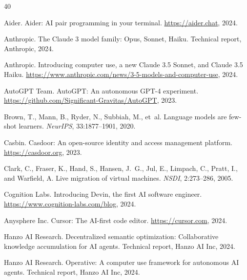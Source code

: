 \documentclass[11pt]{article}
\begin{document}

\begin{thebibliography}{40}

Aider.
\newblock Aider: AI pair programming in your terminal.
\newblock \url{https://aider.chat}, 2024.

Anthropic.
\newblock The Claude 3 model family: Opus, Sonnet, Haiku.
\newblock Technical report, Anthropic, 2024.

Anthropic.
\newblock Introducing computer use, a new Claude 3.5 Sonnet, and Claude 3.5 Haiku.
\newblock \url{https://www.anthropic.com/news/3-5-models-and-computer-use}, 2024.

AutoGPT Team.
\newblock AutoGPT: An autonomous GPT-4 experiment.
\newblock \url{https://github.com/Significant-Gravitas/AutoGPT}, 2023.

Brown, T., Mann, B., Ryder, N., Subbiah, M., et~al.
\newblock Language models are few-shot learners.
\newblock \emph{NeurIPS}, 33:1877--1901, 2020.

Casbin.
\newblock Casdoor: An open-source identity and access management platform.
\newblock \url{https://casdoor.org}, 2023.

Clark, C., Fraser, K., Hand, S., Hansen, J.~G., Jul, E., Limpach, C.,
  Pratt, I., and Warfield, A.
\newblock Live migration of virtual machines.
\newblock \emph{NSDI}, 2:273--286, 2005.

Cognition Labs.
\newblock Introducing Devin, the first AI software engineer.
\newblock \url{https://www.cognition-labs.com/blog}, 2024.

Anysphere Inc.
\newblock Cursor: The AI-first code editor.
\newblock \url{https://cursor.com}, 2024.

Hanzo AI Research.
\newblock Decentralized semantic optimization: Collaborative knowledge
  accumulation for AI agents.
\newblock Technical report, Hanzo AI Inc, 2024.

Hanzo AI Research.
\newblock Operative: A computer use framework for autonomous AI agents.
\newblock Technical report, Hanzo AI Inc, 2024.


\end{thebibliography}
\end{document}
